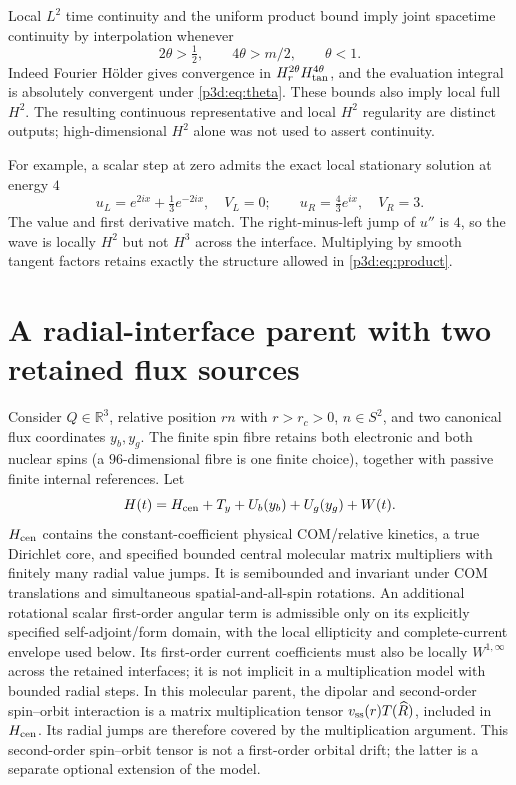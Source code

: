 \documentclass[11pt]{article}
\numberwithin{equation}{section}
\theoremstyle{definition}
\theoremstyle{remark}
\begin{document}
Local $L^2$ time continuity and the uniform product bound imply joint
spacetime continuity by interpolation whenever
\begin{equation}\label{p3d:eq:theta}
 2\theta>\tfrac12,\qquad 4\theta>m/2,\qquad \theta<1.
\end{equation}
Indeed Fourier H\"older gives convergence in
$H^{2\theta}_rH^{4\theta}_{\rm tan}$, and the evaluation integral is
absolutely convergent under \eqref{p3d:eq:theta}. These bounds also
imply local full $H^2$. The resulting continuous representative and
local $H^2$ regularity are distinct outputs; high-dimensional $H^2$
alone was not used to assert continuity.

For example, a scalar step at zero admits the exact local stationary
solution at energy $4$
\[
 u_L=e^{2ix}+\tfrac13e^{-2ix},\quad V_L=0;\qquad
 u_R=\tfrac43e^{ix},\quad V_R=3.
\]
The value and first derivative match. The right-minus-left jump of
$u''$ is $4$, so the wave is locally $H^2$ but not $H^3$ across the
interface. Multiplying by smooth tangent factors retains exactly the
structure allowed in \eqref{p3d:eq:product}.

\section{A radial-interface parent with two retained flux sources}
\label{p3d:sec:OLD}

Consider $Q\in\mathbb R^3$, relative position $rn$ with $r>r_c>0$,
$n\in S^2$, and two canonical flux coordinates $y_b,y_g$.
The finite spin fibre retains both electronic and both nuclear spins
(a $96$-dimensional fibre is one finite choice), together with passive
finite internal references. Let
\begin{equation}\label{p3d:eq:OLD}
 H(t)=H_{\rm cen}+T_y+U_b(y_b)+U_g(y_g)+W(t).
\end{equation}
$H_{\rm cen}$ contains the constant-coefficient physical COM/relative
kinetics, a true Dirichlet core, and specified bounded central molecular
matrix multipliers with finitely many radial value jumps. It is
semibounded and invariant under COM translations and simultaneous
spatial-and-all-spin rotations. An additional rotational scalar
first-order angular term is admissible only on its explicitly specified
self-adjoint/form domain, with the local ellipticity and complete-current
envelope used below. Its first-order current coefficients must also be
locally $W^{1,\infty}$ across the retained interfaces; it is not
implicit in a multiplication model with bounded radial steps.
In this molecular parent, the dipolar and second-order
spin--orbit interaction is a matrix multiplication tensor
$v_{\rm ss}(r)T(\widehat R)$, included in $H_{\rm cen}$.
Its radial jumps are therefore covered by the multiplication
argument. This second-order spin--orbit tensor is not a
first-order orbital drift; the latter is a separate optional
extension of the model.
\end{document}
